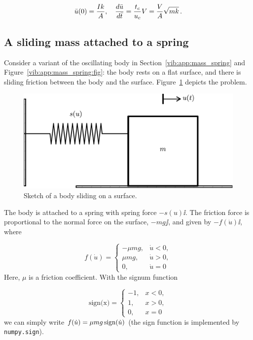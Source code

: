 \documentclass[%
oneside,                 %
final,                   %
10pt]{article}
\begin{document}
\[ \bar u(0) = \frac{Ik}{A},\quad \frac{d\bar u}{d\bar t}=\frac{t_c}{u_c}V = \frac{V}{A}\sqrt{mk}\tp\]




\subsection{A sliding mass attached to a spring}
\label{vib:app:mass_sliding}

Consider a variant of the oscillating body in Section~\ref{vib:app:mass_spring}
and Figure~\ref{vib:app:mass_spring:fig}: the body rests on a flat
surface, and there is sliding friction between the body and the surface.
Figure~\ref{vib:app:mass_sliding:fig} depicts the problem.


\begin{figure}[!ht]  %
  \centerline{\includegraphics[width=0.7\linewidth]{fig-vib/oscillator_sliding.pdf}}
  \caption{
  Sketch of a body sliding on a surface. \label{vib:app:mass_sliding:fig}
  }
\end{figure}


The body is attached to a spring with spring force $-s(u)\ii$.
The friction force is proportional to the normal force on the surface,
$-mg\jj$, and given by $-f(\dot u)\ii$, where

\[ f(\dot u) = \left\lbrace\begin{array}{ll}
-\mu mg,& \dot u < 0,\\ 
\mu mg, & \dot u > 0,\\ 
0,      & \dot u=0
\end{array}\right.\]
Here, $\mu$ is a friction coefficient. With the signum function

\[ \mbox{sign(x)} = \left\lbrace\begin{array}{ll}
-1,& x < 0,\\ 
1, & x > 0,\\ 
0, & x=0
\end{array}\right.\]
we can simply write $f(\dot u) = \mu mg\,\hbox{sign}(\dot u)$
(the sign function is implemented by \texttt{numpy.sign}).
\end{document}
